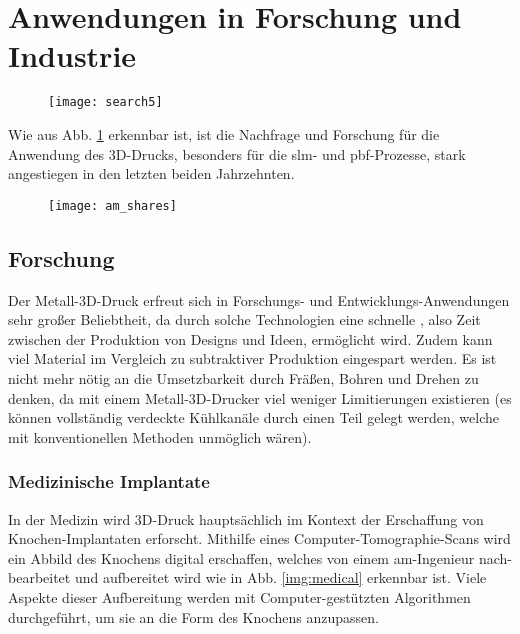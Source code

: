 \documentclass[../main.tex]{subfiles}
\begin{document}
\section{Anwendungen in Forschung und Industrie}
\label{sec:anwendungen}
\begin{figure}[H]
	\centering
	\texttt{[image: search5]}
	\label{img:search_5}
\end{figure}
Wie aus Abb. \ref{img:search_5} erkennbar ist, ist die Nachfrage und Forschung für die Anwendung des 3D-Drucks, besonders für die \acrlong{slm}- und \acrfull{pbf}-Prozesse, stark angestiegen in den letzten beiden Jahrzehnten.

\begin{figure}[H]
	\centering
	\texttt{[image: am\_shares]}
	\label{img:am_shares}
\end{figure} 
\subsection{Forschung}
Der Metall-3D-Druck erfreut sich in Forschungs- und Entwicklungs-Anwendungen sehr großer Beliebtheit, da durch solche Technologien eine schnelle , also Zeit zwischen der Produktion von Designs und Ideen, ermöglicht wird. Zudem kann viel Material im Vergleich zu subtraktiver Produktion eingespart werden. Es ist nicht mehr nötig an die Umsetzbarkeit durch Fräßen, Bohren und Drehen zu denken, da mit einem Metall-3D-Drucker viel weniger Limitierungen existieren (es können vollständig verdeckte Kühlkanäle durch einen Teil gelegt werden, welche mit konventionellen Methoden unmöglich wären).
\subsubsection*{Medizinische Implantate}
\label{sec:medizin}
In der Medizin wird 3D-Druck hauptsächlich im Kontext der Erschaffung von Knochen-Implantaten erforscht. Mithilfe eines Computer-Tomographie-Scans wird ein Abbild des Knochens digital erschaffen, welches von einem \acrshort{am}-Ingenieur nach-bearbeitet und aufbereitet wird wie in Abb. \ref{img:medical} erkennbar ist. Viele Aspekte dieser Aufbereitung werden mit Computer-gestützten Algorithmen durchgeführt, um sie an die Form des Knochens anzupassen.\parencite{doi:10.1146/annurev-bioeng-082020-032402}
\end{document}
